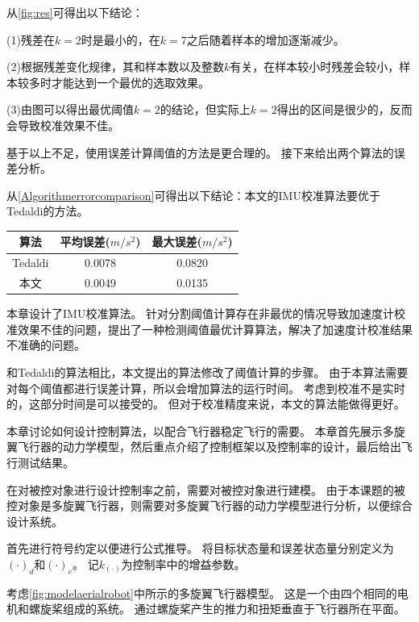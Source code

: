 \documentclass[
  type=master
]{gdutthesis}
\begin{document}
从\autoref{fig:res}可得出以下结论：

(1)残差在$k=2$时是最小的，在$k=7$之后随着样本的增加逐渐减少。

(2)根据残差变化规律，其和样本数以及整数$k$有关，在样本较小时残差会较小，样本较多时才能达到一个最优的选取效果。

(3)由图可以得出最优阈值$k=2$的结论，但实际上$k=2$得出的区间是很少的，反而会导致校准效果不佳。

基于以上不足，使用误差计算阈值的方法是更合理的。
接下来给出两个算法的误差分析。

从\autoref{Algorithmerrorcomparison}可得出以下结论：本文的IMU校准算法要优于Tedaldi的方法。
\begin{table}[h]
	\label{Algorithmerrorcomparison}
	\begin{tabular}{ccc}
		\toprule
		算法 & 平均误差($m/s^2$) & 最大误差($m/s^2$) \\
		\midrule
		Tedaldi & 0.0078 & 0.0820 \\
		本文 & 0.0049 & 0.0135 \\
		\bottomrule
	\end{tabular}
\end{table}

本章设计了IMU校准算法。
针对分割阈值计算存在非最优的情况导致加速度计校准效果不佳的问题，提出了一种检测阈值最优计算算法，解决了加速度计校准结果不准确的问题。

和Tedaldi的算法相比，本文提出的算法修改了阈值计算的步骤。
由于本算法需要对每个阈值都进行误差计算，所以会增加算法的运行时间。
考虑到校准不是实时的，这部分时间是可以接受的。
但对于校准精度来说，本文的算法能做得更好。

本章讨论如何设计控制算法，以配合飞行器稳定飞行的需要。
本章首先展示多旋翼飞行器的动力学模型，然后重点介绍了控制框架以及控制率的设计，最后给出飞行测试结果。

在对被控对象进行设计控制率之前，需要对被控对象进行建模。
由于本课题的被控对象是多旋翼飞行器，则需要对多旋翼飞行器的动力学模型进行分析，以便综合设计系统。

首先进行符号约定以便进行公式推导。
将目标状态量和误差状态量分别定义为$(\cdot)_d$和$(\cdot)_e$。
记$k_{(\cdot)}$为控制率中的增益参数。

考虑\autoref{fig:modelaerialrobot}中所示的多旋翼飞行器模型。
这是一个由四个相同的电机和螺旋桨组成的系统。
通过螺旋桨产生的推力和扭矩垂直于飞行器所在平面。
\end{document}

